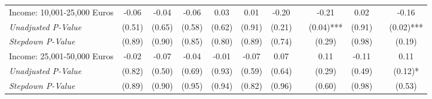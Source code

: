 \begin{tabular}{l c c c c c c c c c c c}
Income: 10,001-25,000 Euros & -0.06 & -0.04 & -0.06 & 0.03 & 0.01 & -0.20 & & -0.21 & 0.02 & & -0.16 \\
\quad \textit{Unadjusted P-Value} & (0.51) & (0.65) & (0.58) & (0.62) & (0.91) & (0.21) & & (0.04)*** & (0.91) & & (0.02)*** \\
\quad \textit{Stepdown P-Value} & (0.89) & (0.90) & (0.85) & (0.80) & (0.89) & (0.74) & & (0.29) & (0.98) & & (0.19) \\
Income: 25,001-50,000 Euros & -0.02 & -0.07 & -0.04 & -0.01 & -0.07 & 0.07 & & 0.11 & -0.11 & & 0.11 \\
\quad \textit{Unadjusted P-Value} & (0.82) & (0.50) & (0.69) & (0.93) & (0.59) & (0.64) & & (0.29) & (0.49) & & (0.12)* \\
\quad \textit{Stepdown P-Value} & (0.89) & (0.90) & (0.95) & (0.94) & (0.82) & (0.96) & & (0.60) & (0.98) & & (0.53) \\
\bottomrule
\end{tabular}
